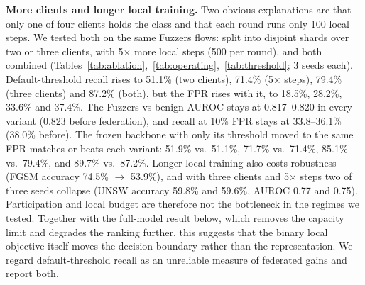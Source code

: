 \begin{table}[t]\centering
\caption{Federated Fuzzers recall vs.\ the frozen backbone with only its decision threshold moved to the same benign FPR (official UNSW-NB15 test set; EC2). The frozen model needs no federation at all.}
\label{tab:threshold}
\end{table}

\textbf{More clients and longer local training.} Two obvious explanations
are that only one of four clients holds the class and that each round runs
only 100 local steps. We tested both on the same Fuzzers flows: split into
disjoint shards over two or three clients, with 5$\times$ more local steps
(500 per round), and both combined (Tables~\ref{tab:ablation},~\ref{tab:operating},~\ref{tab:threshold};
3 seeds each). Default-threshold recall rises to 51.1\% (two clients),
71.4\% (5$\times$ steps), 79.4\% (three clients) and 87.2\% (both), but the
FPR rises with it, to 18.5\%, 28.2\%, 33.6\% and 37.4\%. The Fuzzers-vs-benign
AUROC stays at 0.817--0.820 in every variant (0.823 before federation), and
recall at 10\% FPR stays at 33.8--36.1\% (38.0\% before). The frozen backbone
with only its threshold moved to the same FPR matches or beats each variant:
51.9\% vs.\ 51.1\%, 71.7\% vs.\ 71.4\%, 85.1\% vs.\ 79.4\%, and 89.7\% vs.\
87.2\%. Longer local training also costs robustness (FGSM accuracy 74.5\%
$\rightarrow$ 53.9\%), and with three clients and 5$\times$ steps two of three
seeds collapse (UNSW accuracy 59.8\% and 59.6\%, AUROC 0.77 and 0.75).
Participation and local budget are therefore not the bottleneck in the regimes
we tested. Together with the full-model result below, which removes the
capacity limit and degrades the ranking further, this suggests that the
binary local objective itself moves the decision boundary rather than the
representation. We regard default-threshold recall as an unreliable measure
of federated gains and report both.

